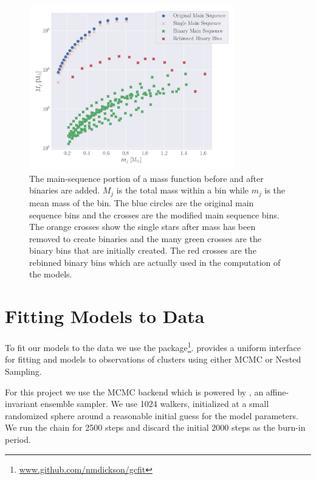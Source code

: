 \begin{figure}
    \centering
    \includegraphics[width=0.8\textwidth]{figures/shifted-mf.png}
    \caption{The main-sequence portion of a mass function before and after binaries are added. $M_j$
        is the total mass within a bin while $m_j$ is the mean mass of the bin. The blue circles are
        the original main sequence bins and the crosses are the modified main sequence bins. The orange
        crosses show the single stars after mass has been removed to create binaries and the many
        green crosses are the binary bins that are initially created. The red crosses are the
        rebinned binary bins which are actually used in the computation of the 
        models.}
    \label{fig:2/shifted-mf}
\end{figure}



\section{Fitting Models to Data}


To fit our models to the data we use the 
package\footnote{\url{www.github.com/nmdickson/gcfit}}.  provides a uniform interface
for fitting \evolvemf{} and  models to observations of clusters using either MCMC or
Nested Sampling.

For this project we use the MCMC backend which is powered by 
\citet{Foreman-Mackey2013,Foreman-Mackey2019}, an affine-invariant ensemble  sampler. We use 1024
walkers, initialized at a small randomized sphere around a reasonable initial guess  for the model
parameters. We run the chain for 2500 steps and discard the initial 2000 steps as the burn-in
period.

